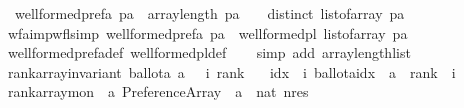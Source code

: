 \begin{isabellebody}
\ \ {\isachardoublequoteopen}well{\isacharunderscore}{\kern0pt}formed{\isacharunderscore}{\kern0pt}prefa\ pa\ {\isacharequal}{\kern0pt}\ {\isacharparenleft}{\kern0pt}{\isacharparenleft}{\kern0pt}array{\isacharunderscore}{\kern0pt}length\ pa\ {\isachargreater}{\kern0pt}\ {}{\isacharparenright}{\kern0pt}\ {\isasymand}\ distinct\ {\isacharparenleft}{\kern0pt}list{\isacharunderscore}{\kern0pt}of{\isacharunderscore}{\kern0pt}array\ pa{\isacharparenright}{\kern0pt}{\isacharparenright}{\kern0pt}{\isachardoublequoteclose}\isanewline
\isanewline
{}\isamarkupfalse%
\ wfa{\isacharunderscore}{\kern0pt}imp{\isacharunderscore}{\kern0pt}wfl{\isacharbrackleft}{\kern0pt}simp{\isacharbrackright}{\kern0pt}{\isacharcolon}{\kern0pt}\ {\isachardoublequoteopen}well{\isacharunderscore}{\kern0pt}formed{\isacharunderscore}{\kern0pt}prefa\ pa\ {\isasymlongrightarrow}\ well{\isacharunderscore}{\kern0pt}formed{\isacharunderscore}{\kern0pt}pl\ {\isacharparenleft}{\kern0pt}list{\isacharunderscore}{\kern0pt}of{\isacharunderscore}{\kern0pt}array\ pa{\isacharparenright}{\kern0pt}{\isachardoublequoteclose}\isanewline
%
\isadelimproof
\ \ %
\endisadelimproof
%
\isatagproof
{}\isamarkupfalse%
\ well{\isacharunderscore}{\kern0pt}formed{\isacharunderscore}{\kern0pt}prefa{\isacharunderscore}{\kern0pt}def\ well{\isacharunderscore}{\kern0pt}formed{\isacharunderscore}{\kern0pt}pl{\isacharunderscore}{\kern0pt}def\isanewline
\ \ \isamarkupfalse%
\ {\isacharparenleft}{\kern0pt}simp\ add{\isacharcolon}{\kern0pt}\ array{\isacharunderscore}{\kern0pt}length{\isacharunderscore}{\kern0pt}list{\isacharparenright}{\kern0pt}%
\endisatagproof
{\isafoldproof}%
%
\isadelimproof
\isanewline
%
\endisadelimproof
\isanewline
{}\isamarkupfalse%
\ {\isachardoublequoteopen}rank{\isacharunderscore}{\kern0pt}array{\isacharunderscore}{\kern0pt}invariant\ ballot{\isacharunderscore}{\kern0pt}a\ a\ {\isasymequiv}\ {\isasymlambda}\ {\isacharparenleft}{\kern0pt}i{\isacharcomma}{\kern0pt}\ rank{\isacharparenright}{\kern0pt}{\isachardot}{\kern0pt}\ \isanewline
\ \ {\isasymforall}idx\ {\isacharless}{\kern0pt}\ i{\isachardot}{\kern0pt}\ ballot{\isacharunderscore}{\kern0pt}a{\isacharbrackleft}{\kern0pt}{\isacharbrackleft}{\kern0pt}idx{\isacharbrackright}{\kern0pt}{\isacharbrackright}{\kern0pt}\ {\isasymnoteq}\ a\ {\isasymor}\ rank\ {\isacharequal}{\kern0pt}\ i{\isachardoublequoteclose}\isanewline
\isanewline
{}\isamarkupfalse%
\ rank{\isacharunderscore}{\kern0pt}array{\isacharunderscore}{\kern0pt}mon\ {\isacharcolon}{\kern0pt}{\isacharcolon}{\kern0pt}\ {\isachardoublequoteopen}{\isacharprime}{\kern0pt}a\ Preference{\isacharunderscore}{\kern0pt}Array\ {\isasymRightarrow}\ {\isacharprime}{\kern0pt}a\ {\isasymRightarrow}\ nat\ nres{\isachardoublequoteclose}\ \isanewline

\end{isabellebody}
